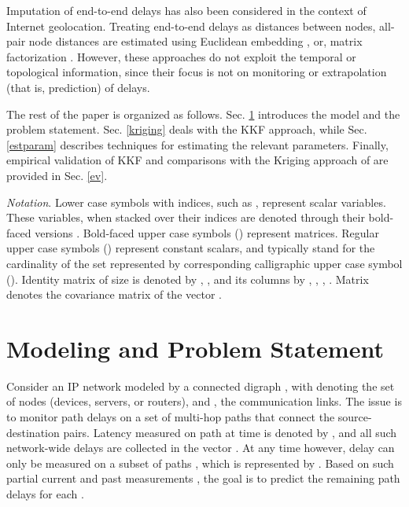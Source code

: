 \documentclass[draftcls,onecolumn,12pt]{IEEEtran}
\theoremstyle{plain}\newtheorem{thm}{Theorem}
\theoremstyle{definition}
\theoremstyle{remark}
\begin{document}
Imputation of end-to-end delays has also been considered in the context of Internet geolocation. 
Treating end-to-end delays as distances between nodes, all-pair node distances are estimated using Euclidean embedding \cite{vivaldi}, or, matrix factorization \cite{fact11}. 
However, these approaches do not exploit the temporal or topological information, since their focus is not on monitoring or extrapolation (that is, prediction) of delays.

The rest of the paper is organized as follows. Sec. \ref{probstat} introduces the model and the problem statement. Sec. \ref{kriging} deals with the KKF approach, while Sec. \ref{estparam} describes techniques for estimating the relevant parameters. 
Finally, empirical validation of KKF and comparisons with the Kriging approach of \cite{nk} 
are provided in Sec. \ref{ev}.  



\emph{Notation}. Lower case symbols with indices, such as , represent scalar variables. These variables, when stacked over their indices are denoted through their bold-faced versions . Bold-faced upper case symbols () represent matrices. Regular upper case symbols () represent constant scalars, and typically stand for the cardinality of the set represented by corresponding calligraphic upper case symbol (). Identity matrix of size  is denoted by , , and its columns by , , , . Matrix  denotes the covariance matrix of the vector . 

\section{Modeling and Problem Statement} \label{probstat}



Consider an IP network modeled by a connected digraph , with  denoting the set of nodes (devices, servers, or routers), and , the communication links.
The issue is to monitor path delays on a set of multi-hop paths  that connect the  source-destination pairs. 
Latency measured on path  at time  is denoted by , and all such network-wide delays are collected in the vector .
At any time  however, delay can only be measured on a subset of paths , which is represented by .
Based on such partial current and past measurements , the goal is to predict the remaining path delays  for each .
\end{document}
